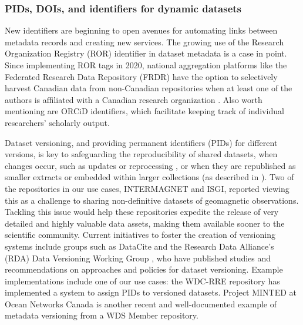 \documentclass{interact}
\begin{document}
\subsubsection{PIDs, DOIs, and identifiers for dynamic datasets}
New identifiers are beginning to open avenues for automating links between metadata records and creating new services. The growing use of the Research Organization Registry (ROR) identifier in dataset metadata is a case in point. Since implementing ROR tags in 2020, national aggregation platforms like the Federated Research Data Repository (FRDR) have the option to selectively harvest Canadian data from non-Canadian repositories when at least one of the authors is affiliated with a Canadian research organization \parencite{portage_network_dryad_2021}. Also worth mentioning are ORCiD identifiers, which facilitate keeping track of individual researchers' scholarly output.

 Dataset versioning, and providing permanent identifiers (PIDs) for different versions, is key to safeguarding the reproducibility of shared datasets, when changes occur, such as updates or reprocessing \parencite{klump_versioning_2021}, or when they are republished as smaller extracts or embedded within larger collections (as described in \cite{klump_doi_2016}). Two of the repositories in our use cases, INTERMAGNET and ISGI, reported viewing this as a challenge to sharing non-definitive datasets of geomagnetic observations. Tackling this issue would help these repositories expedite the release of very detailed and highly valuable data assets, making them available sooner to the scientific community. Current initiatives to foster the creation of versioning systems include groups such as DataCite \parencite{datacite_metadata_working_group_datacite_2019} and the Research Data Alliance's (RDA) Data Versioning Working Group \parencite{klump_versioning_2021, klump_compilation_2020}, who have published studies and recommendations on approaches and policies for dataset versioning. Example implementations include one of our use cases: the WDC-RRE repository has implemented a system to assign PIDs to versioned datasets. Project MINTED at Ocean Networks Canada \parencite{jenkyns_minted_2020, jenkyns_making_2019} is another recent and well-documented example of metadata versioning from a WDS Member repository. 
\end{document}
